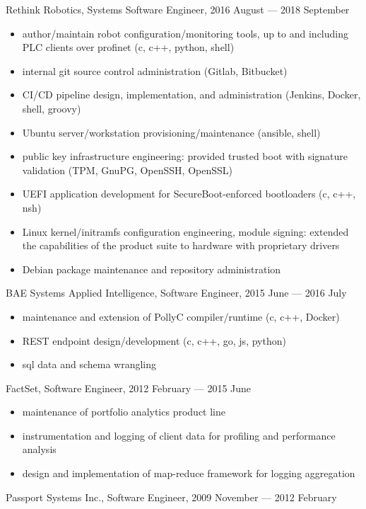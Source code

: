 \documentclass[letterpaper,12pt]{article}
\begin{document}
Rethink Robotics, Systems Software Engineer, 2016 August --- 2018 September

\begin{itemize}
\item author/maintain robot configuration/monitoring tools, up to and including
  PLC clients over profinet (c, c++, python, shell)
\item internal git source control administration (Gitlab, Bitbucket)
\item CI/CD pipeline design, implementation, and administration (Jenkins,
  Docker, shell, groovy)
\item Ubuntu server/workstation provisioning/maintenance (ansible, shell)
\item public key infrastructure engineering: provided trusted boot with
  signature validation (TPM, GnuPG, OpenSSH, OpenSSL)
\item UEFI application development for SecureBoot-enforced bootloaders (c, c++,
  nsh)
\item Linux kernel/initramfs configuration engineering, module signing:
  extended the capabilities of the product suite to hardware with proprietary
  drivers
\item Debian package maintenance and repository administration
\end{itemize}

BAE Systems Applied Intelligence, Software Engineer, 2015 June --- 2016 July

\begin{itemize}
\item maintenance and extension of PollyC compiler/runtime (c, c++, Docker)
\item REST endpoint design/development (c, c++, go, js, python)
\item sql data and schema wrangling
\end{itemize}

FactSet, Software Engineer, 2012 February --- 2015 June

\begin{itemize}
\item maintenance of portfolio analytics product line
\item instrumentation and logging of client data for profiling and performance analysis
\item design and implementation of map-reduce framework for logging aggregation
\end{itemize}

Passport Systems Inc., Software Engineer, 2009 November --- 2012 February
\end{document}
